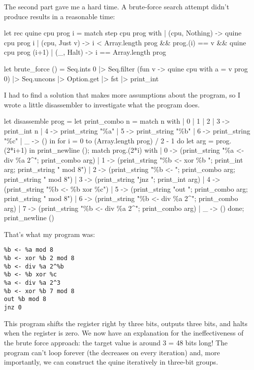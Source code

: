 \documentclass{article}
\begin{document}
The second part gave me a hard time.
A brute-force search attempt didn't produce results in a reasonable time:

\begin{code}[ocaml]
let rec quine cpu prog i =
  match step cpu prog with
  | (cpu, Nothing) -> quine cpu prog i
  | (cpu, Just v) -> i < Array.length prog && prog.(i) == v && quine cpu prog (i+1)
  | (_, Halt) -> i == Array.length prog

let brute_force () =
  Seq.ints 0 |> Seq.filter (fun v -> quine {cpu with a = v} prog 0)
  |> Seq.uncons |> Option.get |> fst |> print_int	
\end{code}

I had to find a solution that makes more assumptions about the program,
so I wrote a little disassembler to investigate what the program does.

\begin{code}[ocaml]
let disassemble prog =
  let print_combo n = match n with | 0 | 1 | 2 | 3 -> print_int n
                                   | 4 -> print_string "\%a"
                                   | 5 -> print_string "\%b"
                                   | 6 -> print_string "\%c"
                                   | _ -> () in
  for i = 0 to (Array.length prog) / 2  - 1 do
    let arg = prog.(2*i+1) in
    print_newline ();
    match prog.(2*i) with
    | 0 -> (print_string "\%a <- div \%a 2^"; print_combo arg)
    | 1 -> (print_string "\%b <- xor \%b "; print_int arg; print_string " mod 8")
    | 2 -> (print_string "\%b <- "; print_combo arg; print_string " mod 8")
    | 3 -> (print_string "jnz "; print_int arg)
    | 4 -> (print_string "\%b <- \%b xor \%c")
    | 5 -> (print_string "out "; print_combo arg; print_string " mod 8")
    | 6 -> (print_string "\%b <- div \%a 2^"; print_combo arg)
    | 7 -> (print_string "\%b <- div \%a 2^"; print_combo arg)
    | _ -> ()
  done;
  print_newline ()
\end{code}

That's what my program was:
\begin{verbatim}
%b <- %a mod 8
%b <- xor %b 2 mod 8
%b <- div %a 2^%b
%b <- %b xor %c
%a <- div %a 2^3
%b <- xor %b 7 mod 8
out %b mod 8
jnz 0
\end{verbatim}

This program shifts the  register right by three bits, outputs three bits, and halts when the register is zero.
We now have an explanation for the ineffectiveness of the brute force approach: the target  value is around 3 = 48 bits long!
The program can't loop forever (the  decreases on every iteration) and, more importantly, we can construct the quine iteratively in three-bit groups.
\end{document}
